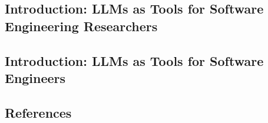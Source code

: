 



\subsection{Introduction: LLMs as Tools for Software Engineering Researchers}
\label{sec:llms-as-tools-for-software-engineering-researchers}









\subsection{Introduction: LLMs as Tools for Software Engineers}
\label{sec:llms-as-tools-for-software-engineers}









\subsection{References}





